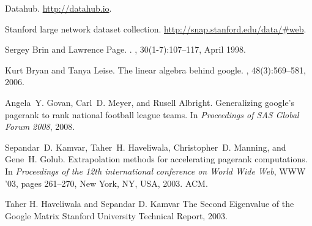 \begin{thebibliography}{1}

Datahub.
\newblock \url{http://datahub.io}.

Stanford large network dataset collection.
\newblock \url{http://snap.stanford.edu/data/#web}.

Sergey Brin and Lawrence Page.
.
, 30(1-7):107--117, April
  1998.

Kurt Bryan and Tanya Leise.
\newblock The linear algebra behind google.
, 48(3):569--581, 2006.

Angela~Y. Govan, Carl~D. Meyer, and Rusell Albright.
\newblock Generalizing google's pagerank to rank national football league
  teams.
\newblock In {\em Proceedings of SAS Global Forum 2008}, 2008.

Sepandar~D. Kamvar, Taher~H. Haveliwala, Christopher~D. Manning, and Gene~H.
  Golub.
\newblock Extrapolation methods for accelerating pagerank computations.
\newblock In {\em Proceedings of the 12th international conference on World
  Wide Web}, WWW '03, pages 261--270, New York, NY, USA, 2003. ACM.
  
 Taher H. Haveliwala and Sepandar D. Kamvar
 \newblock The Second Eigenvalue of the Google Matrix
 \newblock Stanford University Technical Report,
2003.

\end{thebibliography}
